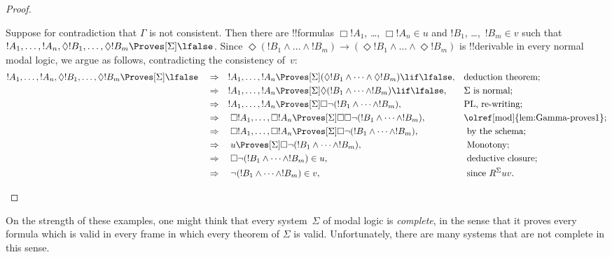 \documentclass[../../../include/open-logic-section]{subfiles}
\begin{document}
\begin{proof}
\begin{enumerate}
    Suppose for contradiction that $\Gamma$ is not consistent. Then
    there are !!{formula}s $\Box!A_1$, \dots, $\Box!A_n \in u$ and $!B_1$,
    \dots,~$!B_m \in v$ such that $!A_1, \dots, !A_n, \Diamond!B_1,
    \dots, \Diamond!B_m \Proves[\Sigma] \lfalse$. Since $\Diamond
    (!B_1 \land \dots \land !B_m) \to (\Diamond!B_1 \land \dots \land
    \Diamond!B_m)$ is !!{derivable} in every normal modal logic, we
    argue as follows, contradicting the consistency of~$v$:
    \begin{align*}
      !A_1, \dots, !A_n, \Diamond!B_1, \dots,
      \Diamond!B_m\Proves[\Sigma] \lfalse & \quad \Rightarrow\quad
      !A_1, \dots,!A_n \Proves[\Sigma] (\Diamond!B_1 \land
      \dots \land \Diamond!B_m) \lif \lfalse,
      && \text{deduction theorem;} \\
      & \quad \Rightarrow\quad !A_1, \dots,!A_n \Proves[\Sigma]
      \Diamond(!B_1 \land
      \dots \land !B_m) \lif \lfalse, && \Sigma \text{ is normal}; \\
      & \quad \Rightarrow\quad !A_1, \dots,!A_n \Proves[\Sigma]
      \Box \lnot (!B_1 \land \dots \land !B_m), && \text{PL, re-writing}; \\
      & \quad \Rightarrow\quad \Box!A_1, \dots,\Box!A_n
      \Proves[\Sigma] \Box\Box \lnot (!B_1 \land \dots \land !B_m), &&
      \text{\olref[mod]{lem:Gamma-proves1}}; \\
      & \quad \Rightarrow\quad \Box!A_1, \dots,\Box!A_n
      \Proves[\Sigma]
      \Box\lnot (!B_1 \land \dots \land !B_m), && \text{ by the
        schema}; \\
      & \quad \Rightarrow\quad u \Proves[\Sigma]
      \Box\lnot (!B_1 \land \dots \land !B_m), && \text{ Monotony}; \\
      & \quad \Rightarrow\quad 
      \Box\lnot (!B_1 \land \dots \land !B_m) \in u, && \text{ deductive closure}; \\
      & \quad \Rightarrow\quad 
      \lnot (!B_1 \land \dots \land !B_m) \in v, && \text{ since }
      R^\Sigma uv. \qedhere
    \end{align*}
  \end{enumerate}
\end{proof}

On the strength of these examples, one might think that every
system~$\Sigma$ of modal logic is \emph{complete}, in the sense that
it proves every formula which is valid in every frame in which every
theorem of $\Sigma$ is valid. Unfortunately, there are many systems
that are not complete in this sense.
\end{document}
